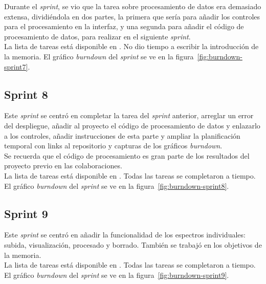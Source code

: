 Durante el \textit{sprint}, se vio que la tarea sobre procesamiento de datos era
demasiado extensa, dividiéndola en dos partes, la primera que sería para añadir 
los controles para el procesamiento en la interfaz, y una segunda para añadir el
código de procesamiento de datos, para realizar en el siguiente
\textit{sprint}.\\

La lista de tareas está disponible en
. No dio tiempo a escribir la introducción de la memoria. El gráfico
\textit{burndown} del \textit{sprint} se ve en la
figura~\ref{fig:burndown-sprint7}.\\


\subsection{Sprint 8}
Este \textit{sprint} se centró en completar la tarea del \textit{sprint}
anterior, arreglar un error del despliegue, añadir al proyecto el código
de procesamiento de datos y enlazarlo a los controles, añadir instrucciones de
esta parte y ampliar la planificación temporal con links al repositorio y
capturas de los gráficos \textit{burndown}.\\

Se recuerda que el código de procesamiento es gran parte de los resultados del
proyecto previo en las colaboraciones.\\

La lista de tareas está disponible en
. Todas las tareas se completaron a tiempo. El gráfico
\textit{burndown} del \textit{sprint} se ve en la
figura~\ref{fig:burndown-sprint8}.\\


\subsection{Sprint 9}
Este \textit{sprint} se centró en añadir la funcionalidad de los espectros
individuales: subida, visualización, procesado y borrado. También se trabajó en
los objetivos de la memoria.\\

La lista de tareas está disponible en
. Todas las tareas se completaron a tiempo. El gráfico
\textit{burndown} del \textit{sprint} se ve en la
figura~\ref{fig:burndown-sprint9}.\\

